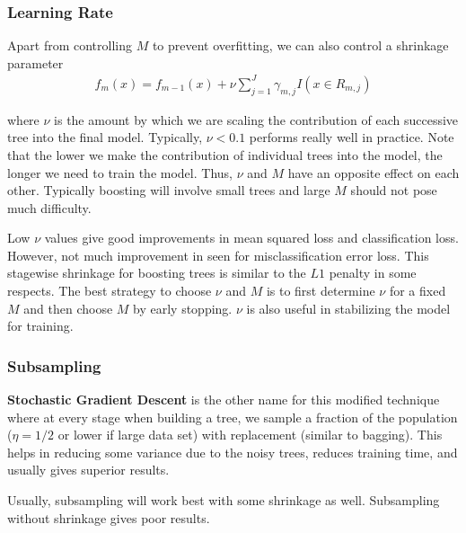 \documentclass[../statistical_learning_notes.tex]{subfiles}
\begin{document}
\subsubsection{Learning Rate}
Apart from controlling $M$ to prevent overfitting, we can also control a shrinkage parameter
\begin{align*}
    f_{m}(x) = f_{m-1}(x) + \nu \sum_{j=1}^{J} \gamma_{m,j} I(x \in R_{m,j})
\end{align*}

where $\nu$ is the amount by which we are scaling the contribution of each successive tree into the final model. Typically, $\nu < 0.1$ performs really well in practice. Note that the lower we make the contribution of individual trees into the model, the longer we need to train the model. Thus, $\nu$ and $M$ have an opposite effect on each other. Typically boosting will involve small trees and large $M$ should not pose much difficulty.\newline

Low $\nu$ values give good improvements in mean squared loss and classification loss. However, not much improvement in seen for misclassification error loss. This stagewise shrinkage for boosting trees is similar to the $L1$ penalty in some respects. The best strategy to choose $\nu$ and $M$ is to first determine $\nu$ for a fixed $M$ and then choose $M$ by early stopping. $\nu$ is also useful in stabilizing the model for training.

\subsubsection{Subsampling}
\textbf{Stochastic Gradient Descent} is the other name for this modified technique where at every stage when building a tree, we sample a fraction of the population ($\eta = 1/2$ or lower if large data set) with replacement (similar to bagging). This helps in reducing some variance due to the noisy trees, reduces training time, and usually gives superior results.\newline

Usually, subsampling will work best with some shrinkage as well. Subsampling without shrinkage gives poor results.


\end{document}
